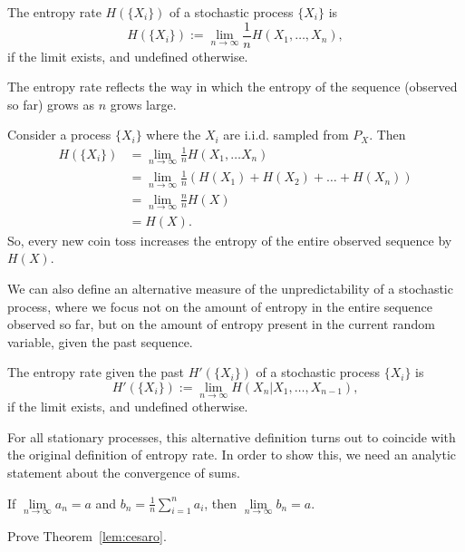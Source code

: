 \begin{definition}
The entropy rate $H(\{X_i\})$ of a stochastic process $\{X_i\}$ is
\[
H(\{X_i\}) := \lim_{n \to \infty} \frac{1}{n} H(X_1, \dots, X_n),
\]
if the limit exists, and undefined otherwise.
\end{definition}
The entropy rate reflects the way in which the entropy of the sequence (observed so far) grows as $n$ grows large.

\begin{example}
Consider a process $\{X_i\}$ where the $X_i$ are i.i.d. sampled from $P_X$. Then
\begin{align*}
H(\{X_i\}) &= \lim_{n \to \infty} \frac{1}{n} H(X_1, \dots X_n)\\
&= \lim_{n \to \infty} \frac{1}{n} \left( H(X_1) + H(X_2) + \ldots + H(X_n) \right)\\
&= \lim_{n \to \infty} \frac{n}{n} H(X)\\
&= H(X).
\end{align*}
So, every new coin toss increases the entropy of the entire observed sequence by $H(X)$.
\end{example}

We can also define an alternative measure of the unpredictability of a stochastic process, where we focus not on the amount of entropy in the entire sequence observed so far, but on the amount of entropy present in the current random variable, given the past sequence.

\begin{definition}
The entropy rate given the past $H'(\{X_i\})$ of a stochastic process $\{X_i\}$ is
\[
H'(\{X_i\}) := \lim_{n \to \infty} H(X_n | X_1, \dots, X_{n-1}),
\]
if the limit exists, and undefined otherwise.
\end{definition}
For all stationary processes, this alternative definition turns out to coincide with the original definition of entropy rate. In order to show this, we need an analytic statement about the convergence of sums.

\begin{theorem}\label{lem:cesaro}
If $\lim\limits_{n \to \infty} a_n = a$ and $b_n = \frac{1}{n} \sum_{i=1}^n a_i$, then $\lim\limits_{n \to \infty} b_n = a$.
\end{theorem}

\begin{exercise}
Prove Theorem~\ref{lem:cesaro}.
\end{exercise}

